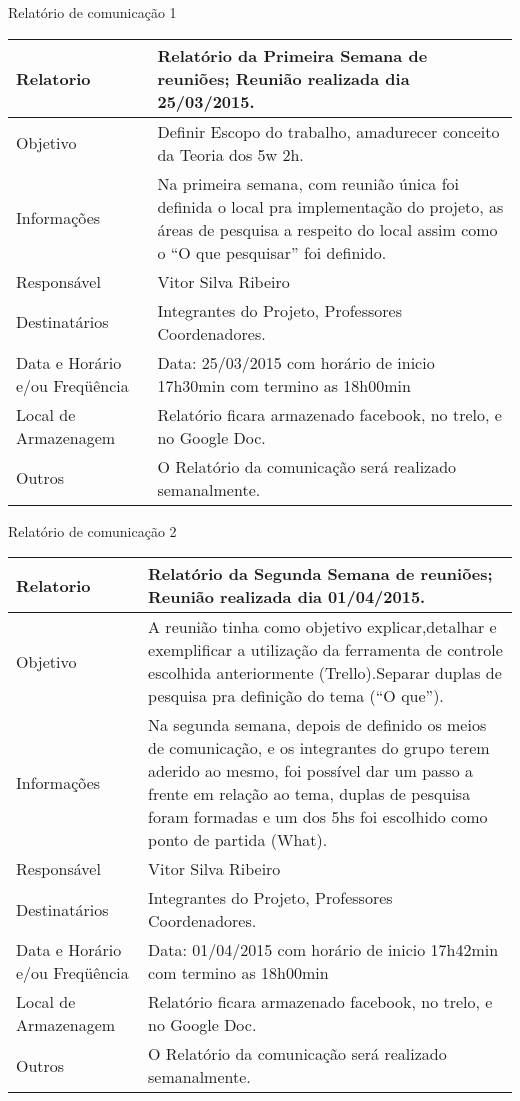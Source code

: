 \documentclass[12pt,openright,oneside,a4paper,brazil]{abntex2}
\begin{document}
 \textual
\begin{center}
{\large Relatório de comunicação 1}
\begin{table}[h]
\begin{tabular}{|p{6cm}|p{9cm}|}\hline
Relatorio & Relatório da Primeira Semana de reuniões; Reunião realizada dia 25/03/2015.\\ \hline
Objetivo & Definir Escopo do trabalho, amadurecer conceito da Teoria dos 5w 2h.\\ \hline
Informações & Na primeira semana, com reunião única foi definida o local pra implementação do projeto, as áreas de pesquisa a respeito do local assim como o “O que pesquisar” foi definido.\\ \hline
Responsável & Vitor Silva Ribeiro\\ \hline
Destinatários & Integrantes do Projeto, Professores Coordenadores.\\ \hline
Data e Horário e/ou Freqüência & Data: 25/03/2015 com horário de inicio 17h30min com termino as 18h00min\\ \hline
Local de Armazenagem & Relatório ficara armazenado facebook, no trelo, e no Google Doc.\\ \hline
Outros & O Relatório da comunicação será realizado semanalmente.\\ \hline

\end{tabular}
\end{table}

{\large Relatório de comunicação 2}
\begin{table}[h]
\begin{tabular}{|p{6cm}|p{9cm}|}\hline
Relatorio & Relatório da Segunda Semana de reuniões; Reunião realizada dia 01/04/2015.\\ \hline
Objetivo & A reunião tinha como objetivo explicar,detalhar e exemplificar a utilização da ferramenta de controle escolhida anteriormente (Trello).Separar duplas de pesquisa pra definição do tema (“O que”).\\ \hline
Informações & Na segunda semana, depois de definido os meios de comunicação, e os integrantes do grupo terem aderido ao mesmo, foi possível dar um passo a frente em relação ao tema, duplas de pesquisa foram formadas e um dos 5hs foi escolhido como ponto de partida (What).\\ \hline
Responsável & Vitor Silva Ribeiro\\ \hline
Destinatários & Integrantes do Projeto, Professores Coordenadores.\\ \hline
Data e Horário e/ou Freqüência & Data: 01/04/2015 com horário de inicio 17h42min com termino as 18h00min\\ \hline
Local de Armazenagem & Relatório ficara armazenado facebook, no trelo, e no Google Doc.\\ \hline
Outros & O Relatório da comunicação será realizado semanalmente.\\ \hline
\end{tabular}
\end{table}
\newpage


\end{center}
\end{document}
